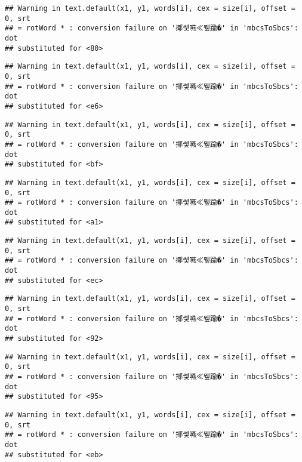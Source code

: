 \documentclass[]{article}
\begin{document}
\begin{verbatim}
## Warning in text.default(x1, y1, words[i], cex = size[i], offset = 0, srt
## = rotWord * : conversion failure on '揶쎛嚥≪뮆踰�' in 'mbcsToSbcs': dot
## substituted for <80>
\end{verbatim}

\begin{verbatim}
## Warning in text.default(x1, y1, words[i], cex = size[i], offset = 0, srt
## = rotWord * : conversion failure on '揶쎛嚥≪뮆踰�' in 'mbcsToSbcs': dot
## substituted for <e6>
\end{verbatim}

\begin{verbatim}
## Warning in text.default(x1, y1, words[i], cex = size[i], offset = 0, srt
## = rotWord * : conversion failure on '揶쎛嚥≪뮆踰�' in 'mbcsToSbcs': dot
## substituted for <bf>
\end{verbatim}

\begin{verbatim}
## Warning in text.default(x1, y1, words[i], cex = size[i], offset = 0, srt
## = rotWord * : conversion failure on '揶쎛嚥≪뮆踰�' in 'mbcsToSbcs': dot
## substituted for <a1>
\end{verbatim}

\begin{verbatim}
## Warning in text.default(x1, y1, words[i], cex = size[i], offset = 0, srt
## = rotWord * : conversion failure on '揶쎛嚥≪뮆踰�' in 'mbcsToSbcs': dot
## substituted for <ec>
\end{verbatim}

\begin{verbatim}
## Warning in text.default(x1, y1, words[i], cex = size[i], offset = 0, srt
## = rotWord * : conversion failure on '揶쎛嚥≪뮆踰�' in 'mbcsToSbcs': dot
## substituted for <92>
\end{verbatim}

\begin{verbatim}
## Warning in text.default(x1, y1, words[i], cex = size[i], offset = 0, srt
## = rotWord * : conversion failure on '揶쎛嚥≪뮆踰�' in 'mbcsToSbcs': dot
## substituted for <95>
\end{verbatim}

\begin{verbatim}
## Warning in text.default(x1, y1, words[i], cex = size[i], offset = 0, srt
## = rotWord * : conversion failure on '揶쎛嚥≪뮆踰�' in 'mbcsToSbcs': dot
## substituted for <eb>
\end{verbatim}
\end{document}

